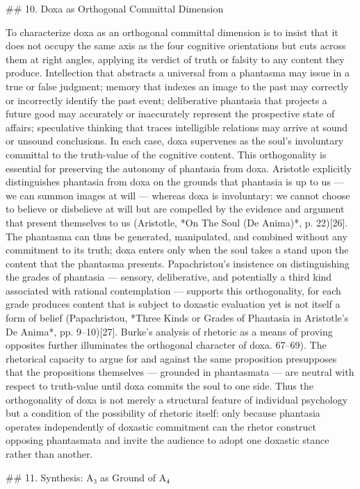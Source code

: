 ## 10. Doxa as Orthogonal Committal Dimension

To characterize doxa as an orthogonal committal dimension is to insist that it does not occupy the same axis as the four cognitive orientations but cuts across them at right angles, applying its verdict of truth or falsity to any content they produce. Intellection that abstracts a universal from a phantasma may issue in a true or false judgment; memory that indexes an image to the past may correctly or incorrectly identify the past event; deliberative phantasia that projects a future good may accurately or inaccurately represent the prospective state of affairs; speculative thinking that traces intelligible relations may arrive at sound or unsound conclusions. In each case, doxa supervenes as the soul's involuntary committal to the truth-value of the cognitive content. This orthogonality is essential for preserving the autonomy of phantasia from doxa. Aristotle explicitly distinguishes phantasia from doxa on the grounds that phantasia is up to us — we can summon images at will — whereas doxa is involuntary: we cannot choose to believe or disbelieve at will but are compelled by the evidence and argument that present themselves to us (Aristotle, *On The Soul (De Anima)*, p. 22)[26]. The phantasma can thus be generated, manipulated, and combined without any commitment to its truth; doxa enters only when the soul takes a stand upon the content that the phantasma presents. Papachristou's insistence on distinguishing the grades of phantasia — sensory, deliberative, and potentially a third kind associated with rational contemplation — supports this orthogonality, for each grade produces content that is subject to doxastic evaluation yet is not itself a form of belief (Papachristou, *Three Kinds or Grades of Phantasia in Aristotle's De Anima*, pp. 9–10)[27]. Burke's analysis of rhetoric as a means of proving opposites further illuminates the orthogonal character of doxa. 67–69). The rhetorical capacity to argue for and against the same proposition presupposes that the propositions themselves — grounded in phantasmata — are neutral with respect to truth-value until doxa commits the soul to one side. Thus the orthogonality of doxa is not merely a structural feature of individual psychology but a condition of the possibility of rhetoric itself: only because phantasia operates independently of doxastic commitment can the rhetor construct opposing phantasmata and invite the audience to adopt one doxastic stance rather than another. 

## 11. Synthesis: A₃ as Ground of A₄

